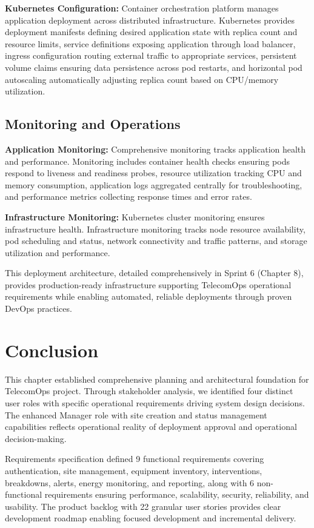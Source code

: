 \textbf{Kubernetes Configuration:} Container orchestration platform manages application deployment across distributed infrastructure. Kubernetes provides deployment manifests defining desired application state with replica count and resource limits, service definitions exposing application through load balancer, ingress configuration routing external traffic to appropriate services, persistent volume claims ensuring data persistence across pod restarts, and horizontal pod autoscaling automatically adjusting replica count based on CPU/memory utilization.

\subsection{Monitoring and Operations}

\textbf{Application Monitoring:} Comprehensive monitoring tracks application health and performance. Monitoring includes container health checks ensuring pods respond to liveness and readiness probes, resource utilization tracking CPU and memory consumption, application logs aggregated centrally for troubleshooting, and performance metrics collecting response times and error rates.

\textbf{Infrastructure Monitoring:} Kubernetes cluster monitoring ensures infrastructure health. Infrastructure monitoring tracks node resource availability, pod scheduling and status, network connectivity and traffic patterns, and storage utilization and performance.

This deployment architecture, detailed comprehensively in Sprint 6 (Chapter 8), provides production-ready infrastructure supporting TelecomOps operational requirements while enabling automated, reliable deployments through proven DevOps practices.

\section*{Conclusion}

This chapter established comprehensive planning and architectural foundation for TelecomOps project. Through stakeholder analysis, we identified four distinct user roles with specific operational requirements driving system design decisions. The enhanced Manager role with site creation and status management capabilities reflects operational reality of deployment approval and operational decision-making.

Requirements specification defined 9 functional requirements covering authentication, site management, equipment inventory, interventions, breakdowns, alerts, energy monitoring, and reporting, along with 6 non-functional requirements ensuring performance, scalability, security, reliability, and usability. The product backlog with 22 granular user stories provides clear development roadmap enabling focused development and incremental delivery.

